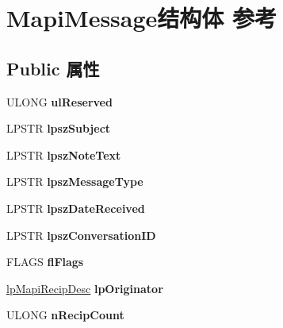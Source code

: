 \hypertarget{struct_mapi_message}{}\section{Mapi\+Message结构体 参考}
\label{struct_mapi_message}
\subsection*{Public 属性}
\begin{DoxyCompactItemize}
\item 
\mbox{\label{struct_mapi_message_a7ed2a8468a7da2ab5b41988a22787acb}} 
U\+L\+O\+NG {\bfseries ul\+Reserved}
\item 
\mbox{\label{struct_mapi_message_a7aad6b8c2403dc6c1fc3163835e17d1a}} 
L\+P\+S\+TR {\bfseries lpsz\+Subject}
\item 
\mbox{\label{struct_mapi_message_a28783a7cedb296cac10c791b0e9355e3}} 
L\+P\+S\+TR {\bfseries lpsz\+Note\+Text}
\item 
\mbox{\label{struct_mapi_message_a994e5cdc2810655e4c19cd28cde3f3ec}} 
L\+P\+S\+TR {\bfseries lpsz\+Message\+Type}
\item 
\mbox{\label{struct_mapi_message_a21480a348182306fa5103c71a712b86c}} 
L\+P\+S\+TR {\bfseries lpsz\+Date\+Received}
\item 
\mbox{\label{struct_mapi_message_ac61aa57ba7491e29e95e1490a17dfa10}} 
L\+P\+S\+TR {\bfseries lpsz\+Conversation\+ID}
\item 
\mbox{\label{struct_mapi_message_a3bf19669e301bb64f57ad97d7d25452c}} 
F\+L\+A\+GS {\bfseries fl\+Flags}
\item 
\mbox{\label{struct_mapi_message_ad877707edb829e5c03cb25ffa9b4140c}} 
\hyperlink{struct_mapi_recip_desc}{lp\+Mapi\+Recip\+Desc} {\bfseries lp\+Originator}
\item 
\mbox{\label{struct_mapi_message_ad979d5ce3773f2cb94ce274ab9f3d1b1}} 
U\+L\+O\+NG {\bfseries n\+Recip\+Count}

\end{DoxyCompactItemize}
